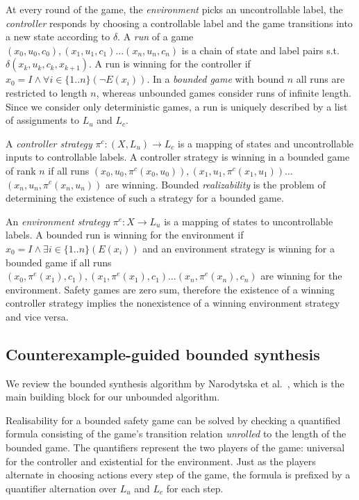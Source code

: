 \documentclass{llncs}
\begin{document}
At every round of the game, the \emph{environment} picks an
uncontrollable label, the \emph{controller} responds by choosing a controllable 
label and the game transitions into a new state according to $\delta$. 
A \emph{run} of a game $(x_0, u_0, c_0), (x_1, u_1, c_1) \dots (x_n, u_n,
c_n)$ is a chain of state and label pairs s.t.\,$\delta(x_k, u_k, c_k, x_{k+1})$. 
A run is winning for the controller if $x_0 = I \land \forall i \in \{1..n\} (\lnot E(x_i))$. 
In a \emph{bounded game} with bound $n$ all runs are restricted to length $n$, whereas unbounded 
games consider runs of infinite length. Since we consider only deterministic games, a run 
is uniquely described by a list of assignments to $L_u$ and $L_c$.

A \emph{controller strategy} $\pi^c : (X, L_u) \to L_c$ is a mapping of states
and uncontrollable inputs to controllable labels. A controller strategy is
winning in a bounded game of rank $n$ if all runs $(x_0, u_0, \pi^c(x_0, u_0)),
(x_1, u_1, \pi^c(x_1, u_1)) \dots$ $(x_n, u_n, \pi^c(x_n, u_n))$ are winning.
Bounded \emph{realizability} is the problem of determining the existence of
such a strategy for a bounded game.

An \emph{environment strategy} $\pi^e : X \to L_u$ is a mapping of states to
uncontrollable labels. A bounded run is winning for the environment if $x_0
= I \land \exists i \in \{1..n\} (E(x_i))$ and an environment strategy is
winning for a bounded game if all runs $(x_0, \pi^e(x_1), c_1), (x_1,
\pi^e(x_1), c_1) \dots (x_n, \pi^e(x_n), c_n)$ are winning for the environment.
Safety games are zero sum, therefore the existence of a winning controller strategy
implies the nonexistence of a winning environment strategy and vice versa.

\subsection{Counterexample-guided bounded synthesis}

We review the bounded synthesis algorithm by Narodytska et
al.~\cite{narodytska2014}, which is the main building block for our unbounded
algorithm.

Realisability for a bounded safety game can be solved by checking a quantified
formula consisting of the game's transition relation \emph{unrolled} to the
length of the bounded game. The quantifiers represent the two players of the
game: universal for the controller and existential for the environment.  Just
as the players alternate in choosing actions every step of the game, the
formula is prefixed by a quantifier alternation over $L_u$ and $L_c$ for each
step.
\end{document}
